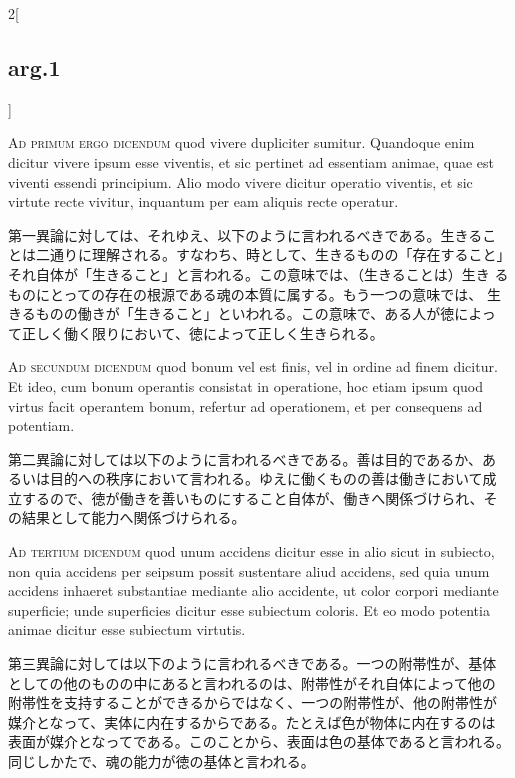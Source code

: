 \documentclass[paper=a4paper,fontsize=10pt,jafontsize=9pt,titlepage]{jlreq}
\begin{document}
\begin{paracol}{2}[\subsection{arg.1}]
\switchcolumn*[\subsection{ad.1}]

{\scshape Ad primum ergo dicendum} quod vivere dupliciter
sumitur. Quandoque enim dicitur vivere ipsum esse viventis, et sic
pertinet ad essentiam animae, quae est viventi essendi
principium. Alio modo vivere dicitur operatio viventis, et sic virtute
recte vivitur, inquantum per eam aliquis recte operatur.

\switchcolumn

第一異論に対しては、それゆえ、以下のように言われるべきである。生きるこ
とは二通りに理解される。すなわち、時として、生きるものの「存在すること」
それ自体が「生きること」と言われる。この意味では、（生きることは）生き
るものにとっての存在の根源である魂の本質に属する。もう一つの意味では、
生きるものの働きが「生きること」といわれる。この意味で、ある人が徳によっ
て正しく働く限りにおいて、徳によって正しく生きられる。

\switchcolumn*[\subsection{ad.2}]

{\scshape Ad secundum dicendum} quod bonum vel est finis, vel in
ordine ad finem dicitur. Et ideo, cum bonum operantis consistat in
operatione, hoc etiam ipsum quod virtus facit operantem bonum,
refertur ad operationem, et per consequens ad potentiam.

\switchcolumn

第二異論に対しては以下のように言われるべきである。善は目的であるか、あ
るいは目的への秩序において言われる。ゆえに働くものの善は働きにおいて成
立するので、徳が働きを善いものにすること自体が、働きへ関係づけられ、そ
の結果として能力へ関係づけられる。

\switchcolumn*[\subsection{ad.3}]

{\scshape Ad tertium dicendum} quod unum accidens dicitur esse in alio
sicut in subiecto, non quia accidens per seipsum possit sustentare
aliud accidens, sed quia unum accidens inhaeret substantiae mediante
alio accidente, ut color corpori mediante superficie; unde superficies
dicitur esse subiectum coloris. Et eo modo potentia animae dicitur
esse subiectum virtutis.

\switchcolumn

第三異論に対しては以下のように言われるべきである。一つの附帯性が、基体
としての他のものの中にあると言われるのは、附帯性がそれ自体によって他の
附帯性を支持することができるからではなく、一つの附帯性が、他の附帯性が
媒介となって、実体に内在するからである。たとえば色が物体に内在するのは
表面が媒介となってである。このことから、表面は色の基体であると言われる。
同じしかたで、魂の能力が徳の基体と言われる。

\end{paracol}
\newpage
{}
{}
\setcounter{section}{2}
\setcounter{subsection}{0}
\end{document}
